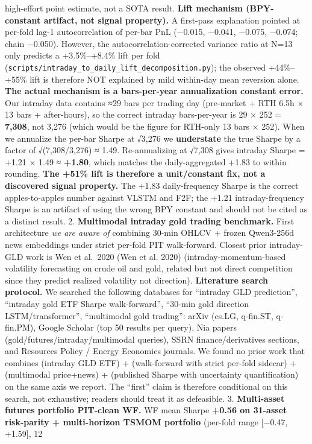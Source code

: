 \documentclass[
]{article}
\begin{document}
high-effort point estimate, not a SOTA result. \textbf{Lift mechanism
(BPY-constant artifact, not signal property).} A first-pass explanation
pointed at per-fold lag-1 autocorrelation of per-bar PnL (−0.015,
−0.041, −0.075, −0.074; chain −0.050). However, the
autocorrelation-corrected variance ratio at N=13 only predicts a
+3.5\%--+8.4\% lift per fold
(\texttt{scripts/intraday\_to\_daily\_lift\_decomposition.py}); the
observed +44\%--+55\% lift is therefore NOT explained by mild within-day
mean reversion alone. \textbf{The actual mechanism is a bars-per-year
annualization constant error.} Our intraday data contains ≈29 bars per
trading day (pre-market + RTH 6.5h × 13 bars + after-hours), so the
correct intraday bars-per-year is 29 × 252 = \textbf{7,308}, not 3,276
(which would be the figure for RTH-only 13 bars × 252). When we
annualize the per-bar Sharpe at √3,276 we \textbf{understate} the true
Sharpe by a factor of √(7,308/3,276) ≈ 1.49. Re-annualizing at √7,308
gives intraday Sharpe = +1.21 × 1.49 ≈ \textbf{+1.80}, which matches the
daily-aggregated +1.83 to within rounding. \textbf{The +51\% lift is
therefore a unit/constant fix, not a discovered signal property.} The
+1.83 daily-frequency Sharpe is the correct apples-to-apples number
against VLSTM and F2F; the +1.21 intraday-frequency Sharpe is an
artifact of using the wrong BPY constant and should not be cited as a
distinct result. 2. \textbf{Multimodal intraday gold trading benchmark.}
First architecture \emph{we are aware of} combining 30-min OHLCV +
frozen Qwen3-256d news embeddings under strict per-fold PIT
walk-forward. Closest prior intraday-GLD work is Wen et al.~2020 (Wen et
al. 2020) (intraday-momentum-based volatility forecasting on crude oil
and gold, related but not direct competition since they predict realized
volatility not direction). \textbf{Literature search protocol.} We
searched the following databases for ``intraday GLD prediction'',
``intraday gold ETF Sharpe walk-forward'', ``30-min gold direction
LSTM/transformer'', ``multimodal gold trading'': arXiv (cs.LG, q-fin.ST,
q-fin.PM), Google Scholar (top 50 results per query), Nia papers
(gold/futures/intraday/multimodal queries), SSRN finance/derivatives
sections, and Resources Policy / Energy Economics journals. We found no
prior work that combines (intraday GLD ETF) + (walk-forward with strict
per-fold sidecar) + (multimodal price+news) + (published Sharpe with
uncertainty quantification) on the same axis we report. The ``first''
claim is therefore conditional on this search, not exhaustive; readers
should treat it as defeasible. 3. \textbf{Multi-asset futures portfolio
PIT-clean WF.} WF mean Sharpe \textbf{+0.56 on 31-asset risk-parity +
multi-horizon TSMOM portfolio} (per-fold range {[}−0.47, +1.59{]}, 12
\end{document}
